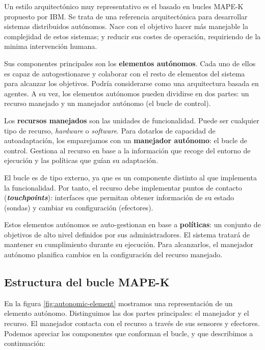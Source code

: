 Un estilo arquitectónico muy representativo es el basado en bucles MAPE-K \cite{ibmcorporationArchitecturalBlueprintAutonomic2006, fonsServiciosAdaptivereadyPara2021} propuesto por IBM. Se trata de una referencia arquitectónica para desarrollar sistemas distribuidos autónomos. Nace con el objetivo hacer más manejable la complejidad de estos sistemas; y reducir sus costes de operación, requiriendo de la minima intervención humana.

Sus componentes principales son los \textbf{elementos autónomos}. Cada uno de ellos es capaz de autogestionarse y colaborar con el resto de elementos del sistema para alcanzar los objetivos. Podría considerarse como una arquitectura basada en agentes. \cite{savaglioAgentbasedInternetThings2020} A su vez, los elementos autónomos pueden dividirse en dos partes: un recurso manejado y un manejador autónomo (el bucle de control).

Los \textbf{recursos manejados} son las unidades de funcionalidad. Puede ser cualquier tipo de recurso, \emph{hardware} o \emph{software}. Para dotarlos de capacidad de autoadaptación, los emparejamos con un \textbf{manejador autónomo}: el bucle de control. Gestiona al recurso en base a la información que recoge del entorno de ejecución y las políticas que guían su adaptación.

El bucle es de tipo externo, ya que es un componente distinto al que implementa la funcionalidad. Por tanto, el recurso debe implementar puntos de contacto (\textbf{\emph{touchpoints}}): interfaces que permitan obtener información de su estado (sondas) y cambiar su configuración (efectores).

Estos elementos autónomos se auto-gestionan en base a \textbf{políticas}: un conjunto de objetivos de alto nivel definidos por sus administradores. El sistema tratará de mantener su cumplimiento durante su ejecución. Para alcanzarlos, el manejador autónomo planifica cambios en la configuración del recurso manejado.

\subsection{Estructura del bucle MAPE-K}

En la figura \ref{fig:autonomic-element} mostramos una representación de un elemento autónomo. Distinguimos las dos partes principales: el manejador y el recurso. El manejador contacta con el recurso a través de sus sensores y efectores. Podemos apreciar los componentes que conforman el bucle, y que describimos a continuación: \cite{ibmcorporationArchitecturalBlueprintAutonomic2006}

